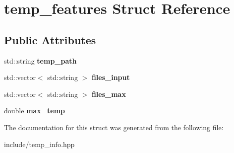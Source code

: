 \hypertarget{structtemp__features}{}\section{temp\+\_\+features Struct Reference}
\label{structtemp__features}
\subsection*{Public Attributes}
\begin{DoxyCompactItemize}
\item 
\mbox{\label{structtemp__features_acc56733685e832768db055b1bd280c62}} 
std\+::string {\bfseries temp\+\_\+path}
\item 
\mbox{\label{structtemp__features_a091a976e742c8fd31c271c540951cfbc}} 
std\+::vector$<$ std\+::string $>$ {\bfseries files\+\_\+input}
\item 
\mbox{\label{structtemp__features_a9e3540e69d92f265dcff0d95b9498a79}} 
std\+::vector$<$ std\+::string $>$ {\bfseries files\+\_\+max}
\item 
\mbox{\label{structtemp__features_a61692c63ea91ed811e03f6ef48191c3e}} 
double {\bfseries max\+\_\+temp}
\end{DoxyCompactItemize}


The documentation for this struct was generated from the following file\+:\begin{DoxyCompactItemize}
\item 
include/temp\+\_\+info.\+hpp\end{DoxyCompactItemize}

